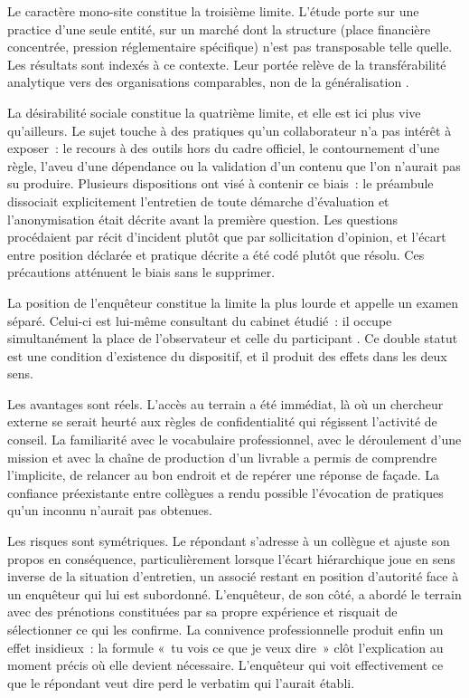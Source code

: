 Le caractère mono-site constitue la troisième limite. L'étude porte sur une practice
d'une seule entité, sur un marché dont la structure (place financière concentrée,
pression réglementaire spécifique) n'est pas transposable telle quelle. Les résultats
sont indexés à ce contexte. Leur portée relève de la transférabilité analytique vers
des organisations comparables, non de la généralisation \cite{lincoln1985}.

La désirabilité sociale constitue la quatrième limite, et elle est ici plus vive
qu'ailleurs. Le sujet touche à des pratiques qu'un collaborateur n'a pas intérêt à
exposer~: le recours à des outils hors du cadre officiel, le contournement d'une règle,
l'aveu d'une dépendance ou la validation d'un contenu que l'on n'aurait pas su produire.
Plusieurs dispositions ont visé à contenir ce biais~: le préambule dissociait
explicitement l'entretien de toute démarche d'évaluation et l'anonymisation était
décrite avant la première question. Les questions procédaient par récit d'incident
plutôt que par sollicitation d'opinion, et l'écart entre position déclarée et pratique
décrite a été codé plutôt que résolu. Ces précautions atténuent le biais sans le supprimer.

La position de l'enquêteur constitue la limite la plus lourde et appelle un examen
séparé. Celui-ci est lui-même consultant du cabinet étudié~: il occupe simultanément la
place de l'observateur et celle du participant \cite{girin1989}. Ce double statut est
une condition d'existence du dispositif, et il produit des effets dans les deux sens.

Les avantages sont réels. L'accès au terrain a été immédiat, là où un chercheur externe
se serait heurté aux règles de confidentialité qui régissent l'activité de conseil. La
familiarité avec le vocabulaire professionnel, avec le déroulement d'une mission et
avec la chaîne de production d'un livrable a permis de comprendre l'implicite, de
relancer au bon endroit et de repérer une réponse de façade. La confiance préexistante
entre collègues a rendu possible l'évocation de pratiques qu'un inconnu n'aurait pas
obtenues.

Les risques sont symétriques. Le répondant s'adresse à un collègue et ajuste son
propos en conséquence, particulièrement lorsque l'écart hiérarchique joue en sens
inverse de la situation d'entretien, un associé restant en position d'autorité face à
un enquêteur qui lui est subordonné. L'enquêteur, de son côté, a abordé le terrain avec
des prénotions constituées par sa propre expérience et risquait de sélectionner ce qui
les confirme. La connivence professionnelle produit enfin un effet insidieux~: la
formule «~tu vois ce que je veux dire~» clôt l'explication au moment précis où elle
devient nécessaire. L'enquêteur qui voit effectivement ce que le répondant veut dire
perd le verbatim qui l'aurait établi.

